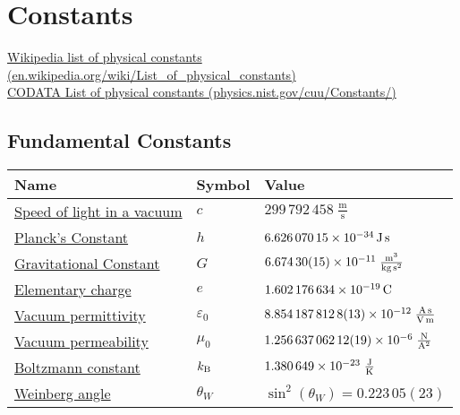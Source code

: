 \section{Constants}
	\href{https://en.wikipedia.org/wiki/List_of_physical_constants}{Wikipedia list of physical constants (en.wikipedia.org/wiki/List\_of\_physical\_constants)}\\
	\href{https://physics.nist.gov/cuu/Constants/}{CODATA List of physical constants (physics.nist.gov/cuu/Constants/)}
	\subsection{Fundamental Constants}
		\begin{center}
		\begin{tabular}{| L{.35\textwidth} L{.15\textwidth} L{.4\textwidth} |}
			\hline Name & Symbol & Value \\ \hline \hline
			\href{https://en.wikipedia.org/wiki/Speed_of_light}{Speed of light in a vacuum} & $c$ & $299\,792\,458\;\frac{\mathrm{m}}{\mathrm{s}}$ \exact \\ \hline
			\href{https://en.wikipedia.org/wiki/Planck_constant}{Planck's Constant} & $h$ & $6.626\,070\,15\times 10^{-34}\,\mathrm{J\,s}$ \exact \\ \hline
			\href{https://en.wikipedia.org/wiki/Gravitational_constant}{Gravitational Constant} & $G$ & $6.674\,30(15)\times 10^{-11}\;\frac{\mathrm{m^3}}{\mathrm{kg\,s^2}} $ \\ \hline
			\href{https://en.wikipedia.org/wiki/Elementary_charge}{Elementary charge} & $e$ & $1.602\,176\,634\times 10^{-19}\,\mathrm{C}$ \exact \\ \hline
			\href{https://en.wikipedia.org/wiki/Vacuum_permittivity}{Vacuum permittivity}  & $\varepsilon_0$ & $8.854\,187\,812\,8(13)\times 10^{-12}\;\frac{\mathrm{A\,s}}{\mathrm{V\,m}}$ \\ \hline
			\href{https://en.wikipedia.org/wiki/Vacuum_permeability}{Vacuum permeability}  & $\mu_0$ & $1.256\,637\,062\,12(19)\times 10^{-6}\;\frac{\mathrm{N}}{\mathrm{A^2}}$ \\ \hline
			\href{https://en.wikipedia.org/wiki/Boltzmann_constant}{Boltzmann constant} & $k_{\text{B}}$ & $1.380\,649\times 10^{-23}\;\frac{\mathrm{J}}{\mathrm{K}}$ \exact \\ \hline
			\href{https://en.wikipedia.org/wiki/Weinberg_angle}{Weinberg angle} & $\theta_W$ & $\sin^2(\theta_W) = 0.223\,05(23)$ \\ \hline
		\end{tabular}
		\end{center}

